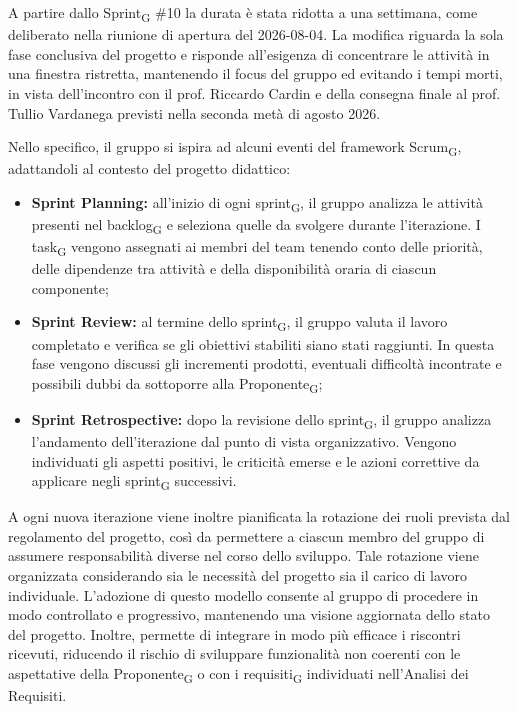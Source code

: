 ﻿\documentclass[a4paper, 10pt, colorlinks=true, linkcolor=black, urlcolor=blue, citecolor=blue, hidelinks]{article}
\begin{document}
A partire dallo Sprint\textsubscript{G} \#10 la durata è stata ridotta a una settimana, come deliberato nella riunione di apertura del 2026-08-04. La modifica riguarda la sola fase conclusiva del progetto e risponde all'esigenza di concentrare le attività in una finestra ristretta, mantenendo il focus del gruppo ed evitando i tempi morti, in vista dell'incontro con il prof. Riccardo Cardin e della consegna finale al prof. Tullio Vardanega previsti nella seconda metà di agosto 2026.

Nello specifico, il gruppo si ispira ad alcuni eventi del framework Scrum\textsubscript{G}, adattandoli al contesto del progetto didattico:

\begin{itemize}
    \item \textbf{Sprint Planning:} all'inizio di ogni sprint\textsubscript{G}, il gruppo analizza le attività presenti nel backlog\textsubscript{G} e seleziona quelle da svolgere durante l'iterazione. I task\textsubscript{G} vengono assegnati ai membri del team tenendo conto delle priorità, delle dipendenze tra attività e della disponibilità oraria di ciascun componente;

    \item \textbf{Sprint Review:} al termine dello sprint\textsubscript{G}, il gruppo valuta il lavoro completato e verifica se gli obiettivi stabiliti siano stati raggiunti. In questa fase vengono discussi gli incrementi prodotti, eventuali difficoltà incontrate e possibili dubbi da sottoporre alla Proponente\textsubscript{G};

    \item \textbf{Sprint Retrospective:} dopo la revisione dello sprint\textsubscript{G}, il gruppo analizza l'andamento dell'iterazione dal punto di vista organizzativo. Vengono individuati gli aspetti positivi, le criticità emerse e le azioni correttive da applicare negli sprint\textsubscript{G} successivi.
\end{itemize}

A ogni nuova iterazione viene inoltre pianificata la rotazione dei ruoli prevista dal regolamento del progetto, così da permettere a ciascun membro del gruppo di assumere responsabilità diverse nel corso dello sviluppo. Tale rotazione viene organizzata considerando sia le necessità del progetto sia il carico di lavoro individuale.
L'adozione di questo modello consente al gruppo di procedere in modo controllato e progressivo, mantenendo una visione aggiornata dello stato del progetto. Inoltre, permette di integrare in modo più efficace i riscontri ricevuti, riducendo il rischio di sviluppare funzionalità non coerenti con le aspettative della Proponente\textsubscript{G} o con i requisiti\textsubscript{G} individuati nell'Analisi dei Requisiti.
\end{document}
